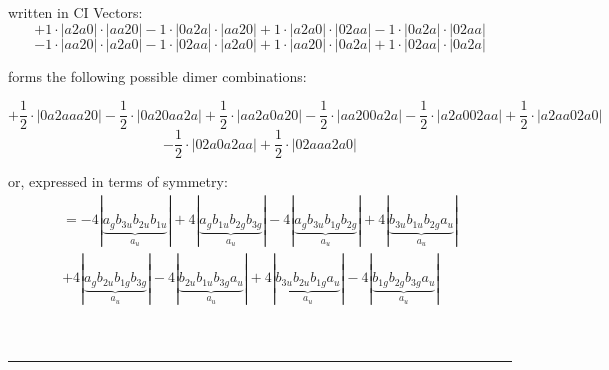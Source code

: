 \documentclass{article}
\begin{document}
\begin{minipage}{\linewidth}
written in CI Vectors: 
 $$+ 1 \cdot \left|a2a0 \right| \cdot \left| aa20 \right| 
- 1 \cdot \left|0a2a \right| \cdot \left| aa20 \right| 
+ 1 \cdot \left|a2a0 \right| \cdot \left| 02aa \right| 
- 1 \cdot \left|0a2a \right| \cdot \left| 02aa \right| 
 $$ $$ - 1 \cdot \left|aa20 \right| \cdot \left| a2a0 \right| 
- 1 \cdot \left|02aa \right| \cdot \left| a2a0 \right| 
+ 1 \cdot \left|aa20 \right| \cdot \left| 0a2a \right| 
+ 1 \cdot \left|02aa \right| \cdot \left| 0a2a \right| 
$$



 forms the following possible dimer combinations:

$$+ \frac{1}{2} \cdot \left|0a2aaa20 \right| - \frac{1}{2} \cdot \left|0a20aa2a \right| + \frac{1}{2} \cdot \left|aa2a0a20 \right| - \frac{1}{2} \cdot \left|aa200a2a \right| - \frac{1}{2} \cdot \left|a2a002aa \right| + \frac{1}{2} \cdot \left|a2aa02a0 \right|  $$ $$ - \frac{1}{2} \cdot \left|02a0a2aa \right| + \frac{1}{2} \cdot \left|02aaa2a0 \right| $$



\end{minipage}
\vspace{0.5cm}


or, expressed in terms of symmetry:\begin{multline*}
=-4\left|\underbrace{a_{g} b_{3u} b_{2u} b_{1u}}_{a_{u}}\right|+4\left|\underbrace{a_{g} b_{1u} b_{2g} b_{3g}}_{a_{u}}\right|-4\left|\underbrace{a_{g} b_{3u} b_{1g} b_{2g}}_{a_{u}}\right|+4\left|\underbrace{b_{3u} b_{1u} b_{2g} a_{u}}_{a_{u}}\right|\\
+4\left|\underbrace{a_{g} b_{2u} b_{1g} b_{3g}}_{a_{u}}\right|-4\left|\underbrace{b_{2u} b_{1u} b_{3g} a_{u}}_{a_{u}}\right|+4\left|\underbrace{b_{3u} b_{2u} b_{1g} a_{u}}_{a_{u}}\right|-4\left|\underbrace{b_{1g} b_{2g} b_{3g} a_{u}}_{a_{u}}\right|
\end{multline*}\\\\

 


\hrule
\vspace{0.5cm}
\end{document}
